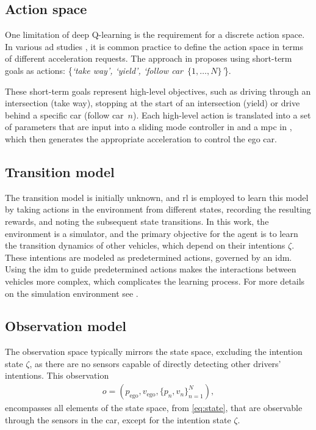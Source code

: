 \subsection{Action space}
\label{sec:pomdp_actionspace}
One limitation of deep Q-learning is the requirement for a discrete action space. In various \gls{ad} studies \cite{bouton2019}, it is common practice to define the action space in terms of different acceleration requests. The approach in \paperLSTM proposes using short-term goals as actions: \{\textit{`take way', `yield', `follow car~$\{1, \dots , N\}$'}\}.

These short-term goals represent high-level objectives, such as driving through an intersection (take way), stopping at the start of an intersection (yield) or drive behind a specific car (follow car~$n$). Each high-level action is translated into a set of parameters that are input into a sliding mode controller in \paperLSTM and a \gls{mpc} in \paperMPC, which then generates the appropriate acceleration to control the ego car.

\subsection{Transition model}
The transition model is initially unknown, and \gls{rl} is employed to learn this model by taking actions in the environment from different states, recording the resulting rewards, and noting the subsequent state transitions. In this work, the environment is a simulator, and the primary objective for the agent is to learn the transition dynamics of other vehicles, which depend on their intentions $\zeta$. These intentions are modeled as predetermined actions, governed by an \gls{idm}. Using the \gls{idm} to guide predetermined actions makes the interactions between vehicles more complex, which complicates the learning process. For more details on the simulation environment see \paperLSTM.


\subsection{Observation model}
The observation space typically mirrors the state space, excluding the intention state $\zeta$, as there are no sensors capable of directly detecting other drivers' intentions. This observation 
\begin{align}
	o = (p_\mathrm{ego}, v_\mathrm{ego}, \{p_{n}, v_n\}_{n=1}^N), 
	\label{eq:observation}
\end{align}
encompasses all elements of the state space, from \eqref{eq:state}, that are observable through the sensors in the car, except for the intention state $\zeta$.

